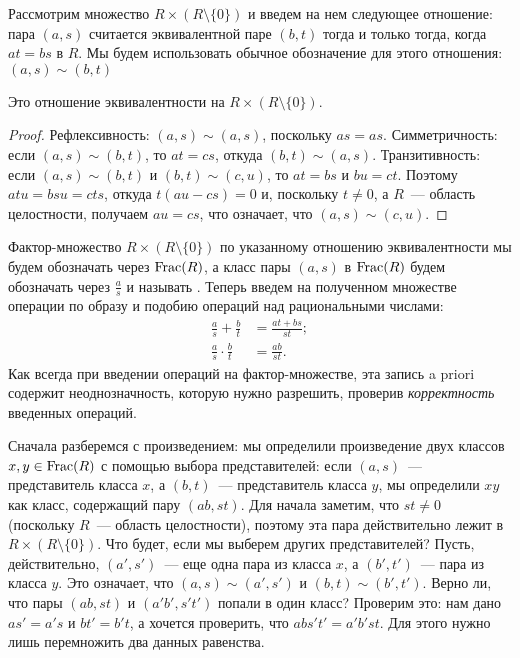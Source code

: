Рассмотрим множество $R\times
(R\setminus\{0\})$ и введем на нем следующее отношение: пара
$(a,s)$ считается эквивалентной паре $(b,t)$ тогда и только тогда,
когда $at=bs$ в $R$. Мы будем использовать обычное обозначение для
этого отношения: $(a,s)\sim (b,t)$

\begin{lemma}
Это отношение эквивалентности на $R\times(R\setminus\{0\})$.
\end{lemma}
\begin{proof}
Рефлексивность: $(a,s)\sim (a,s)$, поскольку $as=as$.
Симметричность: если $(a,s)\sim (b,t)$, то $at=cs$, откуда $(b,t)\sim
(a,s)$.
Транзитивность: если $(a,s)\sim (b,t)$ и $(b,t)\sim (c,u)$, то $at=bs$
и $bu=ct$. Поэтому $atu=bsu=cts$, откуда $t(au-cs)=0$ и, поскольку
$t\neq 0$, а $R$~--- область целостности, получаем $au=cs$, что
означает, что $(a,s)\sim (c,u)$.
\end{proof}

Фактор-множество $R\times (R\setminus\{0\})$ по указанному отношению
эквивалентности мы будем обозначать через $\operatorname{Frac}(R)$, а класс пары
$(a,s)$ в $\operatorname{Frac}(R)$ будем обозначать через $\frac{a}{s}$ и называть
.
Теперь введем на полученном множестве операции по образу и подобию
операций над рациональными числами:
\begin{align*}
\frac{a}{s}+\frac{b}{t}&=\frac{at+bs}{st};\\
\frac{a}{s}\cdot\frac{b}{t}&=\frac{ab}{st}.
\end{align*}
Как всегда при введении операций на фактор-множестве, эта запись a
priori содержит неоднозначность, которую нужно разрешить, проверив
{\it корректность} введенных операций.

Сначала разберемся с произведением: мы определили произведение двух
классов $x,y\in\operatorname{Frac}(R)$ с помощью выбора представителей: если
$(a,s)$~--- представитель класса $x$, а $(b,t)$~--- представитель
класса $y$, мы определили $xy$ как класс, содержащий пару
$(ab,st)$. Для начала заметим, что $st\neq 0$ (поскольку $R$~---
область целостности), поэтому эта пара действительно лежит в $R\times
(R\setminus\{0\})$. Что будет, если мы выберем других
представителей? Пусть, действительно, $(a', s')$~--- еще одна пара из
класса $x$, а $(b', t')$~--- пара из класса $y$. Это означает, что
$(a,s)\sim (a',s')$ и $(b,t)\sim(b',t')$. Верно ли, что пары
$(ab,st)$ и $(a'b',s't')$ попали в один класс? Проверим это:
нам дано $as'=a's$ и $bt'=b't$, а хочется проверить, что
$abs't'=a'b'st$. Для этого нужно лишь перемножить два данных
равенства.

